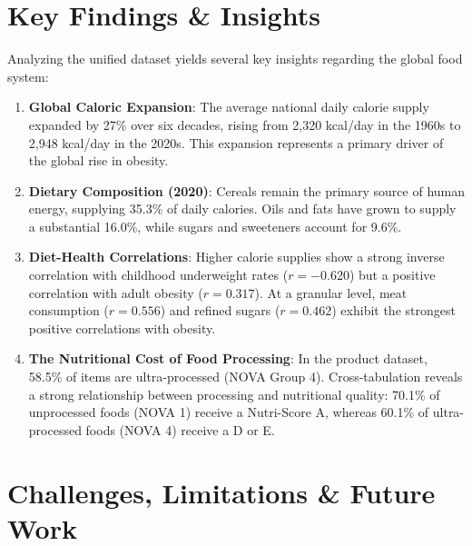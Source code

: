 \documentclass[10pt, a4paper]{article}
\begin{document}
\section{Key Findings \& Insights}
\label{sec:findings}

Analyzing the unified dataset yields several key insights regarding the global food system:
\begin{enumerate}[nosep, leftmargin=1.5em]
    \item \textbf{Global Caloric Expansion}: The average national daily calorie supply expanded by 27\% over six decades, rising from 2,320 kcal/day in the 1960s to 2,948 kcal/day in the 2020s. This expansion represents a primary driver of the global rise in obesity.
    \item \textbf{Dietary Composition (2020)}: Cereals remain the primary source of human energy, supplying 35.3\% of daily calories. Oils and fats have grown to supply a substantial 16.0\%, while sugars and sweeteners account for 9.6\%.
    \item \textbf{Diet-Health Correlations}: Higher calorie supplies show a strong inverse correlation with childhood underweight rates ($r = -0.620$) but a positive correlation with adult obesity ($r = 0.317$). At a granular level, meat consumption ($r = 0.556$) and refined sugars ($r = 0.462$) exhibit the strongest positive correlations with obesity.
    \item \textbf{The Nutritional Cost of Food Processing}: In the product dataset, 58.5\% of items are ultra-processed (NOVA Group 4). Cross-tabulation reveals a strong relationship between processing and nutritional quality: 70.1\% of unprocessed foods (NOVA 1) receive a Nutri-Score A, whereas 60.1\% of ultra-processed foods (NOVA 4) receive a D or E.
\end{enumerate}

\section{Challenges, Limitations \& Future Work}
\label{sec:limits}
\end{document}
